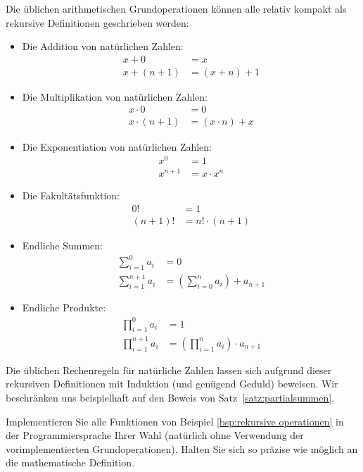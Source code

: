 \begin{example}\label{bsp:rekursive operationen}
Die üblichen arithmetischen Grundoperationen können alle relativ kompakt als rekursive Definitionen geschrieben werden:
\begin{itemize}
\item Die Addition von natürlichen Zahlen:
\begin{align*}
x+0&=x\\
x+(n+1)&=(x+n)+1
\end{align*}
\item Die Multiplikation von natürlichen Zahlen:
\begin{align*}
x\cdot 0 &= 0\\
x\cdot(n+1)&=(x\cdot n)+x
\end{align*}
\item Die Exponentiation von natürlichen Zahlen:
\begin{align*}
x^0&=1\\
x^{n+1}&=x\cdot x^{n}
\end{align*}
\item Die Fakultätsfunktion:
\begin{align*}
0!&=1\\
(n+1)!&=n!\cdot(n+1)
\end{align*}
\item Endliche Summen:
\begin{align*}
\sum_{i=1}^{0}a_i&=0\\
\sum_{i=1}^{n+1}a_{i}&=(\sum_{i=0}^na_i)+a_{n+1}
\end{align*}
\item Endliche Produkte:
\begin{align*}
\prod_{i=1}^{0}a_i&=1\\
\prod_{i=1}^{n+1}a_i&= (\prod_{i=1}^na_i)\cdot a_{n+1}
\end{align*}
\end{itemize}
\end{example}
Die üblichen Rechenregeln für natürliche Zahlen lassen sich aufgrund dieser rekursiven Definitionen mit Induktion (und genügend Geduld) beweisen. Wir beschränken uns beispielhaft auf den Beweis von Satz~\ref{satz:partialsummen}.

\begin{example}
	Implementieren Sie alle Funktionen von Beispiel \ref{bsp:rekursive operationen} in der Programmiersprache Ihrer Wahl (natürlich ohne Verwendung der vorimplementierten Grundoperationen). Halten Sie sich so präzise wie möglich an die mathematische Definition.
\end{example}
\begin{example}
\end{example}

